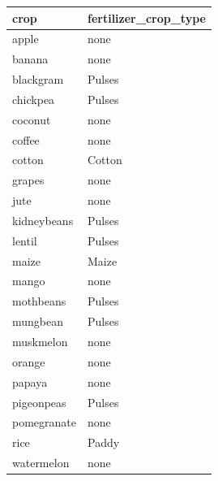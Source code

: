 \begin{tabular}{ll}
\toprule
crop & fertilizer_crop_type \\
\midrule
apple & none \\
banana & none \\
blackgram & Pulses \\
chickpea & Pulses \\
coconut & none \\
coffee & none \\
cotton & Cotton \\
grapes & none \\
jute & none \\
kidneybeans & Pulses \\
lentil & Pulses \\
maize & Maize \\
mango & none \\
mothbeans & Pulses \\
mungbean & Pulses \\
muskmelon & none \\
orange & none \\
papaya & none \\
pigeonpeas & Pulses \\
pomegranate & none \\
rice & Paddy \\
watermelon & none \\
\bottomrule
\end{tabular}

